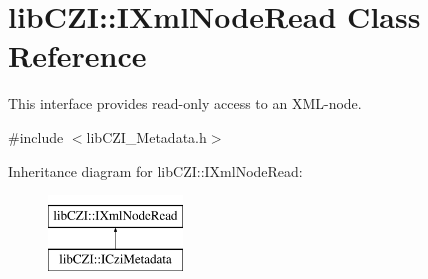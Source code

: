 \hypertarget{classlib_c_z_i_1_1_i_xml_node_read}{}\section{lib\+C\+ZI\+:\+:I\+Xml\+Node\+Read Class Reference}
\label{classlib_c_z_i_1_1_i_xml_node_read}


This interface provides read-\/only access to an X\+M\+L-\/node.  




{\ttfamily \#include $<$lib\+C\+Z\+I\+\_\+\+Metadata.\+h$>$}

Inheritance diagram for lib\+C\+ZI\+:\+:I\+Xml\+Node\+Read\+:\begin{figure}[H]
\begin{center}
\leavevmode
\includegraphics[height=2.000000cm]{classlib_c_z_i_1_1_i_xml_node_read}
\end{center}
\end{figure}
